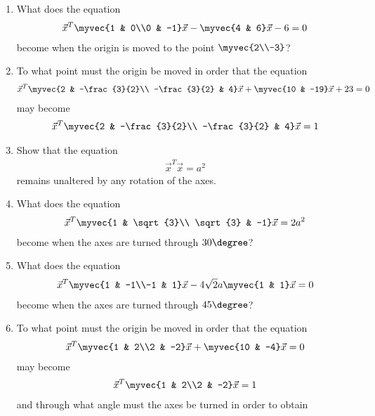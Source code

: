 \renewcommand{\theequation}{\theenumi}
\begin{enumerate}[label=\arabic*.,ref=\thesubsection.\theenumi]
\item What does the equation 
\begin{align}
\vec{x}^T\myvec{1 & 0\\0 & -1}\vec{x}-\myvec{4 & 6}\vec{x}-6=0
\end{align}
become when the origin is moved to the point $\myvec{2\\-3}$?
\item To what point must the origin be moved in order that the equation
\begin{align}
\vec{x}^T\myvec{2 & -\frac{3}{2}\\ -\frac{3}{2} & 4}\vec{x}+\myvec{10 & -19}\vec{x}+23=0
\end{align}
may become
\begin{align}
\vec{x}^T\myvec{2 & -\frac{3}{2}\\ -\frac{3}{2} & 4}\vec{x} = 1
\end{align}
\item Show that the equation
\begin{align}
\vec{x}^T\vec{x}= a^2
\end{align}
remains unaltered by any rotation of the axes.
\item What does the equation
\begin{align}
\vec{x}^T\myvec{1 & \sqrt{3}\\ \sqrt{3} & -1}\vec{x} = 2a^2
\end{align}
become when the axes are turned through $30\degree$?
\item What does the equation
\begin{align}
\vec{x}^T\myvec{1 & -1\\-1 & 1}\vec{x}-4\sqrt{2}a\myvec{1 & 1}\vec{x}=0
\end{align}
become when the axes are turned through $45\degree$?
\item To what point must the origin be moved in order that the equation
\begin{align}
\vec{x}^T\myvec{1 & 2\\2 & -2}\vec{x}+\myvec{10 & -4}\vec{x}=0
\end{align}
may become
\begin{align}
\vec{x}^T\myvec{1 & 2\\2 & -2}\vec{x}= 1
\end{align}
and through what angle must the axes be turned in order to obtain

\end{enumerate}

